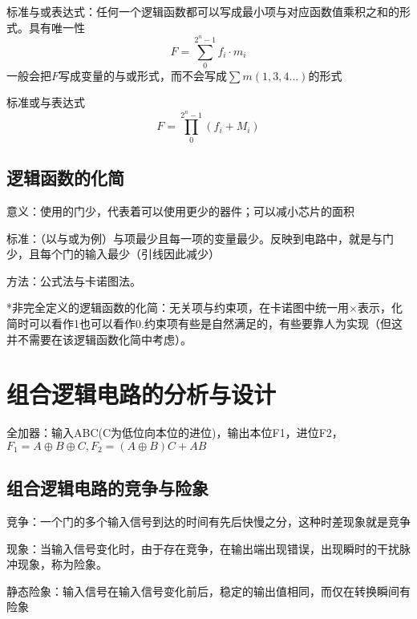 \documentclass{ctexart}
\begin{document}
标准与或表达式：任何一个逻辑函数都可以写成最小项与对应函数值乘积之和的形式。具有唯一性
\begin{equation}
    F=\sum_{0}^{2^n-1}f_i\cdot m_i
\end{equation}
一般会把$F$写成变量的与或形式，而不会写成$\sum m(1,3,4...)$的形式

标准或与表达式
\begin{equation}
    F=\prod_{0}^{2^n-1}(f_i+M_i)
\end{equation}
\subsection{逻辑函数的化简}
意义：使用的门少，代表着可以使用更少的器件；可以减小芯片的面积

标准：（以与或为例）与项最少且每一项的变量最少。反映到电路中，就是与门少，且每个门的输入最少（引线因此减少）

方法：公式法与卡诺图法。{\color{red}{同一个卡诺图，看0可以化成或与式，看1可以化为与或式}}

*非完全定义的逻辑函数的化简：无关项与约束项，在卡诺图中统一用$\times$表示，化简时可以看作1也可以看作0.约束项有些是自然满足的，有些要靠人为实现（但这并不需要在该逻辑函数化简中考虑）。


























\section{组合逻辑电路的分析与设计}
全加器：输入ABC(C为低位向本位的进位)，输出本位F1，进位F2，$F_1=A\oplus B\oplus C,F_2=(A \oplus B)C+AB$
\subsection{组合逻辑电路的竞争与险象}
竞争：一个门的多个输入信号到达的时间有先后快慢之分，这种时差现象就是竞争

现象：当输入信号变化时，由于存在竞争，在输出端出现错误，出现瞬时的干扰脉冲现象，称为险象。

静态险象：输入信号在输入信号变化前后，稳定的输出值相同，而仅在转换瞬间有险象
\end{document}
